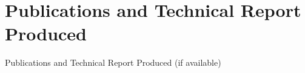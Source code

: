 \chapter{Publications and Technical Report Produced}

Publications and Technical Report Produced (if available)